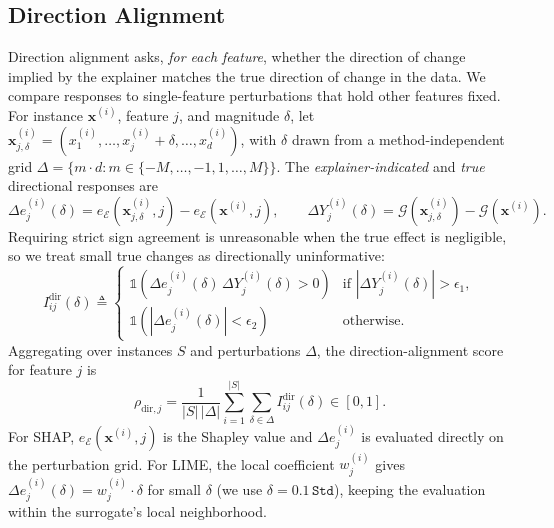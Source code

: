 \documentclass[12pt,letterpaper]{article}
\newcommand{\bx}{\mathbf{x}}
\newcommand{\mG}{\mathcal{G}}
\newcommand{\mE}{\mathcal{E}}
\begin{document}
\subsection{Direction Alignment}
Direction alignment asks, \emph{for each feature}, whether the direction of change
implied by the explainer matches the true direction of change in the data. We
compare responses to single-feature perturbations that hold other features fixed.
For instance $\bx^{(i)}$, feature $j$, and magnitude $\delta$, let
$\bx^{(i)}_{j,\delta}=(x^{(i)}_1,\dots,x^{(i)}_j+\delta,\dots,x^{(i)}_d)$, with
$\delta$ drawn from a method-independent grid
$\Delta=\{m\cdot d: m\in\{-M,\dots,-1,1,\dots,M\}\}$.
The \emph{explainer-indicated} and \emph{true} directional responses are
\begin{equation}
\Delta e^{(i)}_j(\delta)= e_{\mE}(\bx^{(i)}_{j,\delta},j)-e_{\mE}(\bx^{(i)},j),
\qquad
\Delta Y^{(i)}_j(\delta)= \mG(\bx^{(i)}_{j,\delta})-\mG(\bx^{(i)}).
\end{equation}
Requiring strict sign agreement is unreasonable when the true effect is negligible,
so we treat small true changes as directionally uninformative:
\begin{equation}\label{eq:dir-ind}
I^{\text{dir}}_{ij}(\delta)\triangleq
\begin{cases}
\mathds{1}\!\left(\Delta e^{(i)}_j(\delta)\,\Delta Y^{(i)}_j(\delta)>0\right)
   & \text{if } |\Delta Y^{(i)}_j(\delta)|>\epsilon_1,\\[2pt]
\mathds{1}\!\left(|\Delta e^{(i)}_j(\delta)|<\epsilon_2\right) & \text{otherwise.}
\end{cases}
\end{equation}
Aggregating over instances $S$ and perturbations $\Delta$, the direction-alignment
score for feature $j$ is
\begin{equation}\label{eq:dir}
\rho_{\text{dir},j}=\frac{1}{|S|\,|\Delta|}\sum_{i=1}^{|S|}\sum_{\delta\in\Delta}
I^{\text{dir}}_{ij}(\delta)\in[0,1].
\end{equation}
For SHAP, $e_{\mE}(\bx^{(i)},j)$ is the Shapley value and $\Delta e^{(i)}_j$ is
evaluated directly on the perturbation grid. For LIME, the local coefficient
$w^{(i)}_j$ gives $\Delta e^{(i)}_j(\delta)=w^{(i)}_j\cdot\delta$ for small
$\delta$ (we use $\delta=0.1\,\texttt{Std}$), keeping the evaluation within the
surrogate's local neighborhood.
\end{document}
